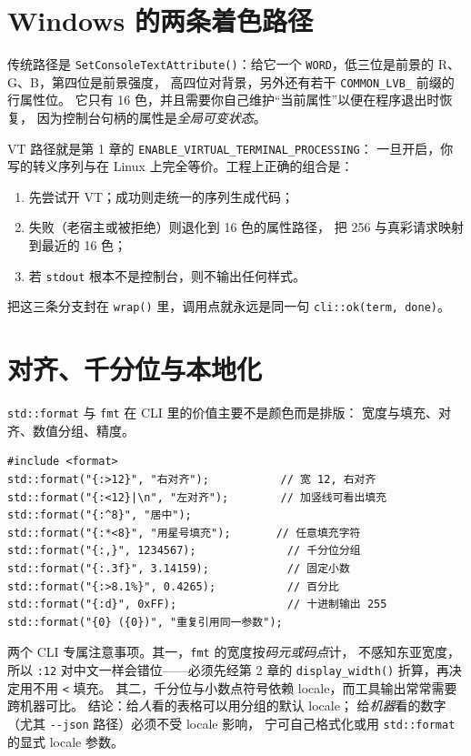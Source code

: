 \documentclass[12pt,a4paper,fontset=fandol]{ctexbook}
\newcommand{\Fn}[1]{\texttt{#1()}}
\newcommand{\Tp}[1]{\texttt{#1}}
\newcommand{\Opt}[1]{\texttt{-\/-#1}}
\newcommand{\Bk}{\allowbreak}
\begin{document}
\section{Windows 的两条着色路径}

传统路径是 \Fn{Set\Bk Console\Bk TextAttribute}：给它一个
\Tp{WORD}，低三位是前景的 R、G、B，第四位是前景强度，
高四位对背景，另外还有若干 \Tp{COMMON\_LVB\_} 前缀的行属性位。
它只有 16 色，并且需要你自己维护``当前属性''以便在程序退出时恢复，
因为控制台句柄的属性是\emph{全局可变状态}。

VT 路径就是第 1 章的 \Tp{ENABLE\_VIRTUAL\_TERMINAL\_PROCESSING}：
一旦开启，你写的转义序列与在 Linux 上完全等价。工程上正确的组合是：

\begin{enumerate}
\item 先尝试开 VT；成功则走统一的序列生成代码；
\item 失败（老宿主或被拒绝）则退化到 16 色的属性路径，
      把 256 与真彩请求映射到最近的 16 色；
\item 若 \Tp{stdout} 根本不是控制台，则不输出任何样式。
\end{enumerate}

把这三条分支封在 \Fn{wrap} 里，调用点就永远是同一句
\Tp{cli::ok(term, \textquotedbl done\textquotedbl)}。

\section{对齐、千分位与本地化}

\Tp{std::format} 与 \Tp{fmt} 在 CLI 里的价值主要不是颜色而是排版：
宽度与填充、对齐、数值分组、精度。

\begin{lstlisting}[caption={排版能力速览}]
#include <format>
std::format("{:>12}", "右对齐");           // 宽 12, 右对齐
std::format("{:<12}|\n", "左对齐");        // 加竖线可看出填充
std::format("{:^8}", "居中");
std::format("{:*<8}", "用星号填充");       // 任意填充字符
std::format("{:,}", 1234567);              // 千分位分组
std::format("{:.3f}", 3.14159);            // 固定小数
std::format("{:>8.1%}", 0.4265);           // 百分比
std::format("{:d}", 0xFF);                 // 十进制输出 255
std::format("{0} ({0})", "重复引用同一参数");
\end{lstlisting}

两个 CLI 专属注意事项。其一，\Tp{fmt} 的宽度按\emph{码元或码点}计，
不感知东亚宽度，所以 \Tp{:12} 对中文一样会错位——必须先经第 2 章的
\Fn{display\_width} 折算，再决定用不用 \Tp{<} 填充。
其二，千分位与小数点符号依赖 locale，而工具输出常常需要跨机器可比。
结论：给\emph{人}看的表格可以用分组的默认 locale；
给\emph{机器}看的数字（尤其 \Opt{json} 路径）必须不受 locale 影响，
宁可自己格式化或用 \Tp{std::format} 的显式 locale 参数。
\end{document}
